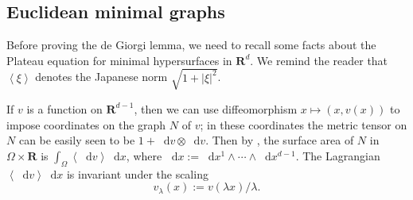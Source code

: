 \documentclass[reqno,10pt]{amsart}
\newcommand{\RR}{\mathbf{R}}
\newcommand{\Hyp}{\mathbf H}
\newcommand{\Sph}{\mathbf S}
\newcommand*\dif{\mathop{}\!\mathrm{d}}
\def\Japan#1{\left \langle #1 \right \rangle}
\theoremstyle{definition}
\newtheorem{remark}[theorem]{Remark}
\numberwithin{equation}{section}
\begin{document}





\subsection{Euclidean minimal graphs}
Before proving the de Giorgi lemma, we need to recall some facts about the Plateau equation for minimal hypersurfaces in $\RR^d$.
We remind the reader that $\Japan\xi$ denotes the Japanese norm $\sqrt{1 + |\xi|^2}$.

If $v$ is a function on $\RR^{d - 1}$, then we can use diffeomorphism $x \mapsto (x, v(x))$ to impose coordinates on the graph $N$ of $v$; in these coordinates the metric tensor on $N$ can be easily seen to be $1 + \dif v \otimes \dif v$.
Then by \cite[(24)]{Petersen2008}, the surface area of $N$ in $\Omega \times \RR$ is $\int_\Omega \Japan{\dif v} \dif x$, where $\dif x := \dif x^1 \wedge \cdots \wedge \dif x^{d - 1}$.
The Lagrangian $\Japan{\dif v} \dif x$ is invariant under the scaling
\begin{equation}\label{rescaled solution}
v_\lambda(x) := v(\lambda x)/\lambda.
\end{equation}
\end{document}
